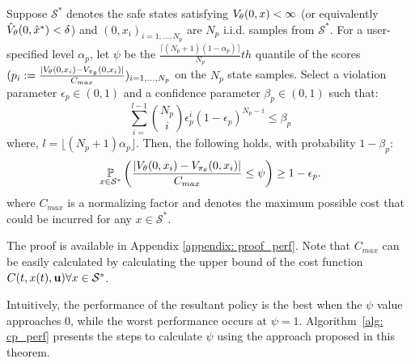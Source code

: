 \begin{theorem}\label{thm: perf_verification}
    Suppose $\mathcal{S}^*$ denotes the safe states satisfying $V_{\theta}(0, x) < \infty$ (or equivalently $\hat{V}_{\theta}(0, \hat{x}^*) < \delta$) and $(0, x_i)_{i=1, \dots, N_p}$ are $N_p$ i.i.d. samples from $\mathcal{S}^*$. For a user-specified level $\alpha_p$, let $\psi$ be the $\frac{\lceil(N_p+1)(1-\alpha_p)\rceil}{N_p}th$ quantile of the scores $(p_i := \frac{|V_{\theta}(0, x_i) - V_{\pi_{\theta}}(0, x_i)|}{C_{max}})_{i=1, \dots, N_p}$ on the $N_p$ state samples.
    Select a violation parameter $\epsilon_p \in (0, 1)$ and a confidence parameter $\beta_p \in (0, 1)$ such that:
    \begin{equation} \label{eq: perf_eps_calc}
          \sum_{i=}^{l-1} \binom{N_p}{i} \epsilon_p^i (1 - \epsilon_p)^{N_p - i} \leq \beta_p
    \end{equation}
    where, \( l = \lfloor (N_p+1)\alpha_p \rfloor \).
    Then, the following holds, with probability $1-\beta_p$:
    \begin{equation}
        \underset{x \in \mathcal{S}^*}{\mathbb{P}}\left(\frac{|V_{\theta}(0, x_i) - V_{\pi_{\theta}}(0, x_i)|}{C_{max}} \leq \psi \right) \geq 1-\epsilon_p.
    \end{equation}
where $C_{max}$ is a normalizing factor and denotes the maximum possible cost that could be incurred for any $x \in \mathcal{S}^*$. 
\end{theorem}

The proof is available in Appendix \ref{appendix: proof_perf}. Note that $C_{max}$ can be easily calculated by calculating the upper bound of the cost function $C(t,x(t), \mathbf{u}) \forall x \in \mathcal{S}^*$.

Intuitively, the performance of the resultant policy is the best when the $\psi$ value approaches $0$, while the worst performance occurs at $\psi = 1$.
Algorithm~\ref{alg: cp_perf} presents the steps to calculate $\psi$ using the approach proposed in this theorem. 



